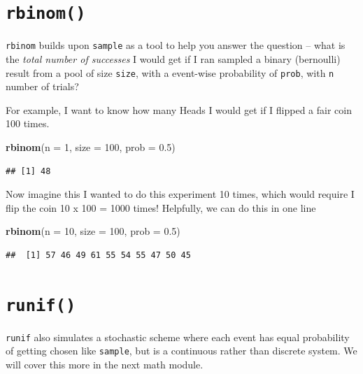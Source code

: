 \documentclass[]{book}
\newenvironment{Shaded}{\begin{snugshade}}{\end{snugshade}}
\newcommand{\KeywordTok}[1]{\textcolor[rgb]{0.13,0.29,0.53}{\textbf{#1}}}
\newcommand{\DataTypeTok}[1]{\textcolor[rgb]{0.13,0.29,0.53}{#1}}
\newcommand{\DecValTok}[1]{\textcolor[rgb]{0.00,0.00,0.81}{#1}}
\newcommand{\FloatTok}[1]{\textcolor[rgb]{0.00,0.00,0.81}{#1}}
\newcommand{\NormalTok}[1]{#1}
\theoremstyle{definition}
\theoremstyle{definition}
\theoremstyle{definition}
\theoremstyle{remark}
\begin{document}
\section{\texorpdfstring{\texttt{rbinom()}}{rbinom()}}\label{rbinom}

\texttt{rbinom} builds upon \texttt{sample} as a tool to help you answer
the question -- what is the \emph{total number of successes} I would get
if I ran sampled a binary (bernoulli) result from a pool of size
\texttt{size}, with a event-wise probability of \texttt{prob}, with
\texttt{n} number of trials?

For example, I want to know how many Heads I would get if I flipped a
fair coin 100 times.

\begin{Shaded}
\begin{Highlighting}[]
\KeywordTok{rbinom}\NormalTok{(}\DataTypeTok{n =} \DecValTok{1}\NormalTok{, }\DataTypeTok{size =} \DecValTok{100}\NormalTok{, }\DataTypeTok{prob =} \FloatTok{0.5}\NormalTok{)}
\end{Highlighting}
\end{Shaded}

\begin{verbatim}
## [1] 48
\end{verbatim}

Now imagine this I wanted to do this experiment 10 times, which would
require I flip the coin 10 x 100 = 1000 times! Helpfully, we can do this
in one line

\begin{Shaded}
\begin{Highlighting}[]
\KeywordTok{rbinom}\NormalTok{(}\DataTypeTok{n =} \DecValTok{10}\NormalTok{, }\DataTypeTok{size =} \DecValTok{100}\NormalTok{, }\DataTypeTok{prob =} \FloatTok{0.5}\NormalTok{)}
\end{Highlighting}
\end{Shaded}

\begin{verbatim}
##  [1] 57 46 49 61 55 54 55 47 50 45
\end{verbatim}

\section{\texorpdfstring{\texttt{runif()}}{runif()}}\label{runif}

\texttt{runif} also simulates a stochastic scheme where each event has
equal probability of getting chosen like \texttt{sample}, but is a
continuous rather than discrete system. We will cover this more in the
next math module.
\end{document}
